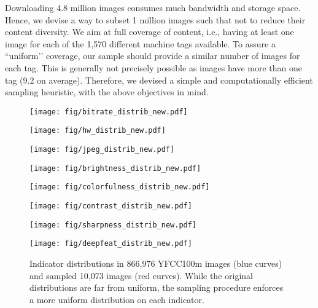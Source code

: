 \documentclass{article}
\begin{document}
Downloading 4.8 million images consumes much bandwidth and storage space. Hence, we devise a way to subset 1 million images such that not to reduce their content diversity. We aim at full coverage of content, i.e., having at least one image for each of the 1,570 different machine tags available. To assure a ``uniform’’ coverage, our sample should provide a similar number of images for each tag. This is generally not precisely possible as images have more than one tag (9.2 on average). Therefore, we devised a simple and computationally efficient  sampling heuristic, with the above objectives in mind.
\begin{figure*}[t]
\centering
\begin{minipage}{0.121\linewidth}
\centerline{\texttt{[image: fig/bitrate\_distrib\_new.pdf]}}
\end{minipage}
\begin{minipage}{0.121\linewidth}
\centerline{\texttt{[image: fig/hw\_distrib\_new.pdf]}}
\end{minipage}
\begin{minipage}{0.121\linewidth}
\centerline{\texttt{[image: fig/jpeg\_distrib\_new.pdf]}}
\end{minipage}
\begin{minipage}{0.121\linewidth}
\centerline{\texttt{[image: fig/brightness\_distrib\_new.pdf]}}
\end{minipage}
\begin{minipage}{0.121\linewidth}
\centerline{\texttt{[image: fig/colorfulness\_distrib\_new.pdf]}}
\end{minipage}
\begin{minipage}{0.121\linewidth}
\centerline{\texttt{[image: fig/contrast\_distrib\_new.pdf]}}
\end{minipage}
\begin{minipage}{0.121\linewidth}
\centerline{\texttt{[image: fig/sharpness\_distrib\_new.pdf]}}
\end{minipage}
\begin{minipage}{0.121\linewidth}
\centerline{\texttt{[image: fig/deepfeat\_distrib\_new.pdf]}}
\end{minipage}
\caption{Indicator distributions in 866,976 YFCC100m images (blue curves) and sampled 10,073 images (red curves). While the original distributions are far from uniform, the sampling procedure enforces a more uniform distribution on each indicator.}
\label{fig:unisample}
\end{figure*}
\end{document}
